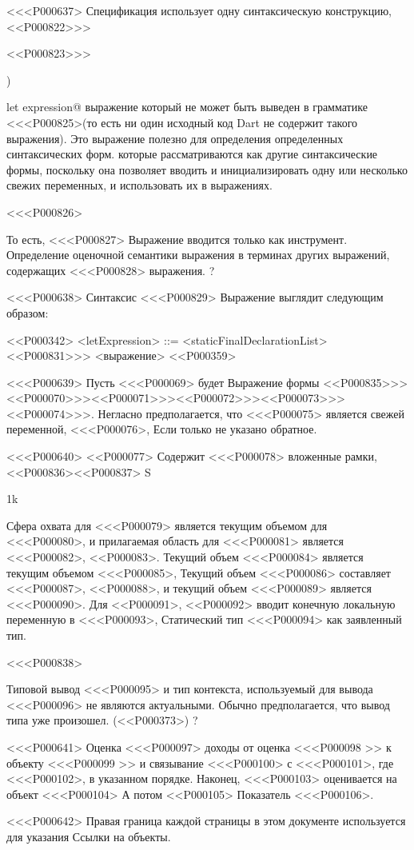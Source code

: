 {{{{{{{{<<<P000637>%
Спецификация использует одну синтаксическую конструкцию,
<<P000822>>>{<<P000823>>>{) {let expression@\LET{} выражение
который не может быть выведен в грамматике
<<<P000825>{(то есть ни один исходный код Dart не содержит такого выражения)}.
Это выражение полезно для определения определенных синтаксических форм.
которые рассматриваются как другие синтаксические формы,
поскольку она позволяет вводить и инициализировать одну или несколько свежих переменных,
и использовать их в выражениях.

<<<P000826>{%
То есть, <<<P000827> Выражение вводится только как инструмент.
Определение оценочной семантики выражения
в терминах других выражений, содержащих <<<P000828> выражения.%
?

<<<P000638>%
Синтаксис <<<P000829> Выражение выглядит следующим образом:

<<P000342>
<letExpression> ::= \LET{} <staticFinalDeclarationList><<P000831>>>{} <выражение>
<<P000359>

<<<P000639>%
%
Пусть <<<P000069> будет \LET Выражение формы
<<P000835>>>{<<P000070>>>}{<<P000071>>>}{<<P000072>>>}{<<P000073>>>}{<<P000074>>>}.
Негласно предполагается, что <<<P000075> является свежей переменной, <<<P000076>,
Если только не указано обратное.

<<<P000640>%
<<P000077> Содержит <<<P000078> вложенные рамки, <<P000836><<P000837> S}{1}{k}}
Сфера охвата для <<<P000079> является текущим объемом для <<<P000080>,
и прилагаемая область для <<<P000081> является <<<P000082>, <<P000083>.
Текущий объем <<<P000084> является текущим объемом <<<P000085>,
Текущий объем <<<P000086> составляет <<<P000087>, <<P000088>,
и текущий объем <<<P000089> является <<<P000090>.
Для <<P000091>, <<P000092> вводит конечную локальную переменную в <<<P000093>,
Статический тип <<<P000094> как заявленный тип.

<<<P000838>{%
Типовой вывод <<<P000095> и тип контекста, используемый для вывода <<<P000096>
не являются актуальными.
Обычно предполагается, что вывод типа уже произошел.
(<<P000373>)%
?

<<<P000641>%
Оценка <<<P000097> доходы от
оценка <<<P000098 >> к объекту <<<P000099 >> и связывание <<<P000100> с <<<P000101>,
где <<<P000102>, в указанном порядке.
Наконец, <<<P000103> оценивается на объект <<<P000104> А потом
<<P000105> Показатель <<<P000106>.

<<<P000642>%
Правая граница каждой страницы в этом документе используется для указания
Ссылки на объекты.

}}}}}}}}}}}

